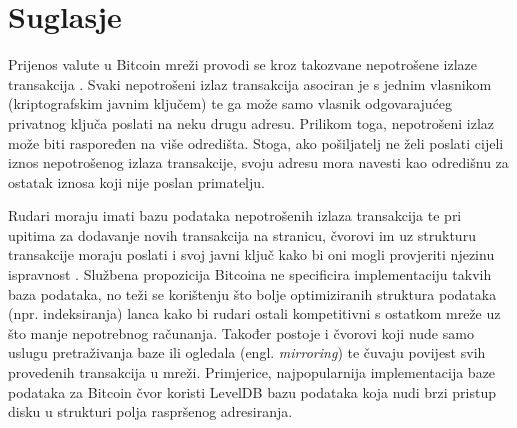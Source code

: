 \documentclass[utf8, zavrsni]{fer}
\begin{document}
\section{Suglasje}
Prijenos valute u Bitcoin mreži provodi se kroz takozvane nepotrošene izlaze transakcija \footnotemark. Svaki nepotrošeni izlaz transakcija asociran je s jednim vlasnikom (kriptografskim javnim ključem) te ga može samo vlasnik odgovarajućeg privatnog ključa poslati na neku drugu adresu. Prilikom toga, nepotrošeni izlaz može biti raspoređen na više odredišta. Stoga, ako pošiljatelj ne želi poslati cijeli iznos nepotrošenog izlaza transakcije, svoju adresu mora navesti kao odredišnu za ostatak iznosa koji nije poslan primatelju.

Rudari moraju imati bazu podataka nepotrošenih izlaza transakcija te pri upitima za dodavanje novih transakcija na stranicu, čvorovi im uz strukturu transakcije moraju poslati i svoj javni ključ kako bi oni mogli provjeriti njezinu ispravnost \footnotemark. Službena propozicija Bitcoina ne specificira implementaciju takvih baza podataka, no teži se korištenju što bolje optimiziranih struktura podataka (npr. indeksiranja) lanca kako bi rudari ostali kompetitivni s ostatkom mreže uz što manje nepotrebnog računanja. Također postoje i čvorovi koji nude samo uslugu pretraživanja baze ili ogledala (engl. \textit{mirroring}) te čuvaju povijest svih provedenih transakcija u mreži. Primjerice, najpopularnija implementacija baze podataka za Bitcoin čvor koristi LevelDB bazu podataka koja nudi brzi pristup disku u strukturi polja raspršenog adresiranja.
\end{document}
